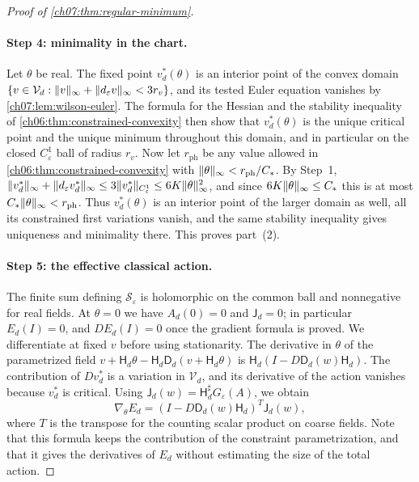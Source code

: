 \begin{proof}[Proof of \cref{ch07:thm:regular-minimum}]
\paragraph{Step 4: minimality in the chart.}
Let $\theta$ be real. The fixed point $v_d^*(\theta)$ is an interior point of the convex domain $\{v\in\mathcal V_d:\lVert v\rVert_\infty+\lVert d_\varepsilon v\rVert_\infty<3r_v\}$, and its tested Euler equation vanishes by \cref{ch07:lem:wilson-euler}. The formula for the Hessian and the stability inequality of \cref{ch06:thm:constrained-convexity} then show that $v_d^*(\theta)$ is the unique critical point and the unique minimum throughout this domain, and in particular on the closed $C^1_\varepsilon$ ball of radius $r_v$. Now let $r_{\mathrm{ph}}$ be any value allowed in \cref{ch06:thm:constrained-convexity} with $\lVert \theta\rVert_\infty<r_{\mathrm{ph}}/C_*$. By Step~1, $\lVert v_d^*\rVert_\infty+\lVert d_\varepsilon v_d^*\rVert_\infty\le3\lVert v_d^*\rVert_{C^1_\varepsilon}\le6K\lVert \theta\rVert_\infty^2$, and since $6K\lVert \theta\rVert_\infty\le C_*$ this is at most $C_*\lVert \theta\rVert_\infty<r_{\mathrm{ph}}$. Thus $v_d^*(\theta)$ is an interior point of the larger domain as well, all its constrained first variations vanish, and the same stability inequality gives uniqueness and minimality there. This proves part~(2).

\paragraph{Step 5: the effective classical action.}
The finite sum defining $\mathscr S_\varepsilon$ is holomorphic on the common ball and nonnegative for real fields. At $\theta=0$ we have $A_d(0)=0$ and $\mathsf J_d=0$; in particular $E_d(I)=0$, and $DE_d(I)=0$ once the gradient formula is proved. We differentiate at fixed $v$ before using stationarity. The derivative in $\theta$ of the parametrized field $v+\mathsf H_d\theta-\mathsf H_d\mathsf D_d(v+\mathsf H_d\theta)$ is $\mathsf H_d(I-D\mathsf D_d(w)\mathsf H_d)$. The contribution of $Dv_d^*$ is a variation in $\mathcal V_d$, and its derivative of the action vanishes because $v_d^*$ is critical. Using $\mathsf J_d(w)=\mathsf H_d^\sharp G_\varepsilon(A)$, we obtain
\begin{equation}\label{ch07:eq:envelope}
 \nabla_\theta E_d=(I-D\mathsf D_d(w)\mathsf H_d)^T\mathsf J_d(w),
\end{equation}
where $T$ is the transpose for the counting scalar product on coarse fields. Note that this formula keeps the contribution of the constraint parametrization, and that it gives the derivatives of $E_d$ without estimating the size of the total action.


\end{proof}
